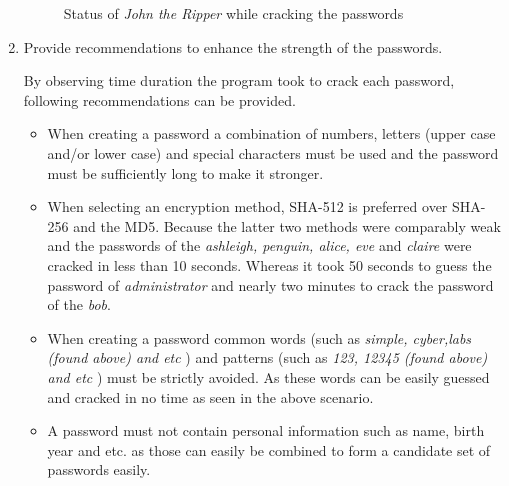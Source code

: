 \documentclass[11pt,letterpaper]{article}
\begin{document}
\begin{enumerate}
		\begin{figure}[H]
			\centering
			\caption{Status of \textit{John the Ripper} while cracking the passwords }
		\end{figure}
		\pagebreak
		\item Provide recommendations to enhance the strength of the passwords.
		
		By observing time duration the program took to crack each password, following recommendations can be provided.
		
		\begin{itemize}
			\item When creating a password a combination of numbers, letters (upper case and/or lower case)  and special characters must be used and the password must be sufficiently long to make it stronger.
			
			\item When selecting an encryption method, SHA-512 is preferred over SHA-256 and the MD5. Because the latter two methods were comparably weak and the passwords of the \textit{ashleigh, penguin, alice, eve} and \textit{claire} were cracked in less than 10 seconds. Whereas it took 50 seconds to guess the password of \textit{administrator} and nearly two minutes to crack the password of the \textit{bob}.
			
			\item When creating a password common words (such as \textit{simple, cyber,labs (found above)  and etc} ) and patterns (such as \textit{123, 12345 (found above) and etc} ) must be strictly avoided. As these words can be easily guessed and cracked in no time as seen in the above scenario.					
			
			\item A password must not contain personal information such as name, birth year and etc. as those can easily be combined to form a candidate set of passwords easily.
		\end{itemize}
		
		
		
		\clearpage
		
	\end{enumerate}    
	
\end{document}
